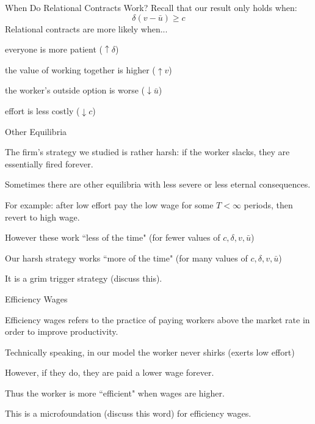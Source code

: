 \documentclass[aspectratio=169,usenames,dvipsnames]{beamer}
\newenvironment{wideitemize}{\itemize\addtolength{\itemsep}{10pt}}{\enditemize}
\begin{document}
\begin{frame}{When Do Relational Contracts Work?}
Recall that our result only holds when:
\[\delta(v-\bar u) \geq c\]
Relational contracts are more likely when...
\begin{wideitemize}
    \item  everyone is more patient ($\uparrow \delta $)
    \item the value of working together is higher ($\uparrow v $)
    \item the worker's outside option is worse ($\downarrow \bar u $)
    \item effort is less costly ($\downarrow c $)
\end{wideitemize}
    
\end{frame}

\begin{frame}{Other Equilibria}

\begin{wideitemize}
    \item The firm's strategy we studied is rather harsh: if the worker slacks, they are essentially fired forever.
    \item Sometimes there are other equilibria with less severe or less eternal consequences.
    \item For example: after low effort pay the low wage for some $T<\infty$ periods, then revert to high wage.
    \item However these work ``less of the time" (for fewer values of $c,\delta, v,\bar u$)
    \item Our harsh strategy works ``more of the time" (for many values of $c,\delta, v,\bar u$)
    \item It is a grim trigger strategy (discuss this).
\end{wideitemize}
    
\end{frame}

\begin{frame}{Efficiency Wages}
\begin{definition}
    Efficiency wages refers to the practice of paying workers above the market rate in order to improve productivity.
\end{definition}
\begin{wideitemize}
    \item Technically speaking, in our model the worker never shirks (exerts low effort)
    \item However, if they do, they are paid a lower wage forever.
    \item Thus the worker is more ``efficient" when wages are higher.
    \item This is a microfoundation (discuss this word) for efficiency wages.
\end{wideitemize}
    
\end{frame}
\end{document}

